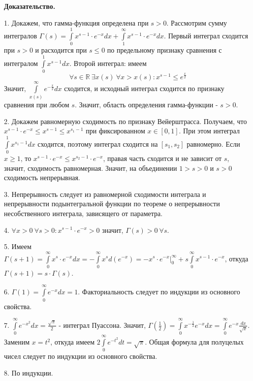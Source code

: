 \textbf{Доказательство.}

1. Докажем, что гамма-функция определена при $s>0$. 
Рассмотрим сумму интегралов
$\Gamma(s)=\int\limits_{0}^{1}x^{s-1}\cdot e^{-x}dx+
\int\limits_{1}^{\infty}x^{s-1}\cdot e^{-x}dx$. 
Первый интеграл сходится при $s>0$ и расходится при $s\leqslant 0$
по предельному признаку сравнения с интегралом
$\int\limits_{0}^{1}x^{s-1}dx$. Второй интеграл: имеем
$$\forall s\in \mathbb{R}~\exists x(s)~\forall x>x(s):
x^{s-1}\leqslant e^{\frac{x}{2}}$$ 
Значит, $\int\limits_{x(s)}^{\infty}e^{-\frac{x}{2}}dx$ сходится, и исходный
интеграл сходится по признаку сравнения при любом $s$. Значит, область 
определения гамма-функции -  $s>0$.

2. Докажем равномерную сходимость по признаку Вейерштрасса. Получаем, что
$x^{s-1}\cdot e^{-x}\leqslant x^{s-1}\leqslant x^{s_1-1}$ при фиксированном
$x\in [0,1]$. При этом интеграл $\int\limits_{0}^{1}x^{s_1-1}dx$ сходится, 
поэтому интеграл сходится на $[s_1,s_2]$ равномерно. Если $x\geqslant 1$,
то $x^{s-1}\cdot e^{-x}\leqslant x^{s_2-1}\cdot e^{-x}$, правая часть 
сходится и не зависит от $s$, значит, сходимость равномерная. Значит,
на объединении $1>s>0$ и  $s>0$ сходимость непрерывная.

3. Непрерывность следует из равномерной сходимости интеграла и непрерывности
подынтегральной функции по теореме о непрерывности несобственного интеграла,
зависящего от параметра. 

4. $\forall x>0~\forall s>0:x^{s-1}\cdot e^{-x}>0$ значит, 
$\Gamma(s)>0~\forall s$.

5. Имеем $\Gamma(s+1)=\int\limits_{0}^{\infty}x^{s}\cdot e^{-x}dx=
-\int\limits_{0}^{\infty}x^sd(e^{-x})=-x^{s}\cdot e^{-x}\Big|^\infty_0+
s \int\limits_{0}^{\infty}x^{s-1}\cdot e^{-x}$, откуда $\Gamma(s+1)=
s\cdot \Gamma(s)$.

6. $\Gamma(1)=\int\limits_{0}^{\infty}e^{-x}dx=1$. Факториальность следует 
по индукции из основного свойства. 

7. $\int\limits_{0}^{\infty}e^{-x^2}dx=\frac{\sqrt{\pi} }{2}$ - интеграл 
Пуассона. Значит, $\Gamma(\frac{1}{2})=\int\limits_{0}^{\infty}x^{-\frac{1}{2}}
e^{-x}dx=\int\limits_{0}^{\infty}e^{-x}\frac{dx}{\sqrt{x}}$. Заменим 
$x=t^2$, откуда  имеем $2 \int\limits_{0}^{\infty}e^{-t^2}dt=\sqrt{\pi}$.
Общая формула для полуцелых чисел следует по индукции из основного свойства.

8. По индукции.


